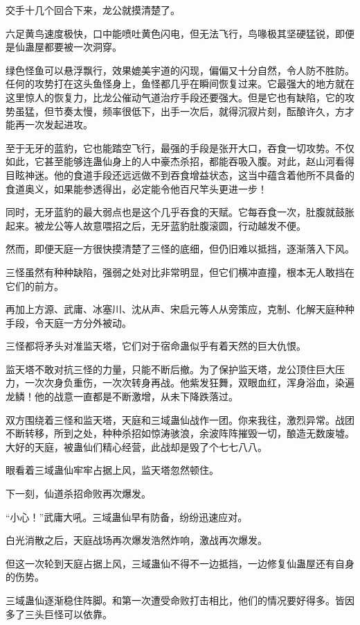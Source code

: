 \begin{this_body}
交手十几个回合下来，龙公就摸清楚了。

六足黄鸟速度极快，口中能喷吐黄色闪电，但无法飞行，鸟喙极其坚硬猛锐，即便是仙蛊屋都要被一次洞穿。

绿色怪鱼可以悬浮飘行，效果媲美宇道的闪现，偏偏又十分自然，令人防不胜防。任何的攻势打在这头鱼怪身上，鱼怪都几乎在瞬间恢复过来。它最强大的地方就在这里惊人的恢复力，比龙公催动气道治疗手段还要强大。但是它也有缺陷，它的攻势虽猛，但节奏太慢，频率很低下，出手一次后，就得沉寂片刻，酝酿许久，方才能再一次发起进攻。

至于无牙的蓝豹，它也能踏空飞行，最强的手段是张开大口，吞食一切攻势。不仅如此，它甚至能够连蛊仙身上的人中豪杰杀招，都能吞吸入腹。对此，赵山河看得目眩神迷。他的食道手段还远远做不到吞食增益状态，这当中蕴含着他所不具备的食道奥义，如果能参透得出，必定能令他百尺竿头更进一步！

同时，无牙蓝豹的最大弱点也是这个几乎吞食的天赋。它每吞食一次，肚腹就鼓胀起来。被龙公等人故意喂招之后，无牙蓝豹肚腹滚圆，行动越发不便。

然而，即便天庭一方很快摸清楚了三怪的底细，但仍旧难以抵挡，逐渐落入下风。

三怪虽然有种种缺陷，强弱之处对比非常明显，但它们横冲直撞，根本无人敢挡在它们的前方。

再加上方源、武庸、冰塞川、沈从声、宋启元等人从旁策应，克制、化解天庭种种手段，令天庭一方分外被动。

三怪都将矛头对准监天塔，它们对于宿命蛊似乎有着天然的巨大仇恨。

监天塔不敢对抗三怪的力量，只能不断后撤。为了保护监天塔，龙公顶住巨大压力，一次次身负重伤，一次次转身再战。他紫发狂舞，双眼血红，浑身浴血，染遍龙鳞！他的战意一直都是不断激增，从未下降跌落过。

双方围绕着三怪和监天塔，天庭和三域蛊仙战作一团。你来我往，激烈异常。战团不断转移，所到之处，种种杀招如惊涛骇浪，余波阵阵摧毁一切，酿造无数废墟。大好的天庭，被蛊仙们精心经营，此战却是毁了个七七八八。

眼看着三域蛊仙牢牢占据上风，监天塔忽然顿住。

下一刻，仙道杀招命败再次爆发。

“小心！”武庸大吼。三域蛊仙早有防备，纷纷迅速应对。

白光消散之后，天庭战场再次爆发浩然炸响，激战再次爆发。

但这一次轮到天庭占据上风，三域蛊仙不得不一边抵挡，一边修复仙蛊屋还有自身的伤势。

三域蛊仙逐渐稳住阵脚。和第一次遭受命败打击相比，他们的情况要好得多。皆因多了三头巨怪可以依靠。


\end{this_body}
